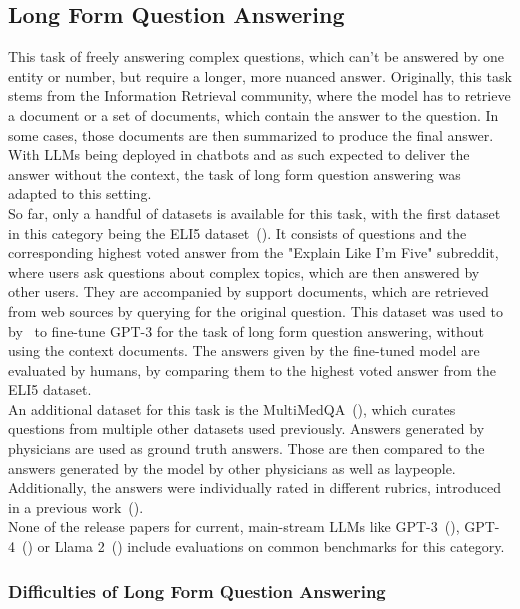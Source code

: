 \subsection{Long Form Question Answering}\label{free-form-qa}
This task of freely answering complex questions, which can't be answered by one entity or number, but require a longer, more nuanced answer.
Originally, this task stems from the Information Retrieval community, where the model has to retrieve a document or a set of documents, which contain the answer to the question.
In some cases, those documents are then summarized to produce the final answer.
With LLMs being deployed in chatbots and as such expected to deliver the answer without the context, the task of long form question answering was adapted to this setting.
\\
So far, only a handful of datasets is available for this task, with the first dataset in this category being the ELI5 dataset~(\cite{fan:2019}).
It consists of questions and the corresponding highest voted answer from the "Explain Like I'm Five" subreddit, where users ask questions about complex topics, which are then answered by other users.
They are accompanied by support documents, which are retrieved from web sources by querying for the original question.
This dataset was used to by~\cite{nakano:2021} to fine-tune GPT-3 for the task of long form question answering, without using the context documents.
The answers given by the fine-tuned model are evaluated by humans, by comparing them to the highest voted answer from the ELI5 dataset.
\\ 
An additional dataset for this task is the MultiMedQA~(\cite{singhal:2023}), which curates questions from multiple other datasets used previously. 
Answers generated by physicians are used as ground truth answers.
Those are then compared to the answers generated by the model by other physicians as well as laypeople.
Additionally, the answers were individually rated in different rubrics, introduced in a previous work~(\cite{singhal:2022}).
\\
None of the release papers for current, main-stream LLMs like GPT-3~(\cite{brown:2020}), GPT-4~(\cite{openai:2023}) or Llama 2~(\cite{touvron:2023}) include evaluations on common benchmarks for this category.

\subsubsection{Difficulties of Long Form Question Answering}\label{free-form-qa-difficulties}

